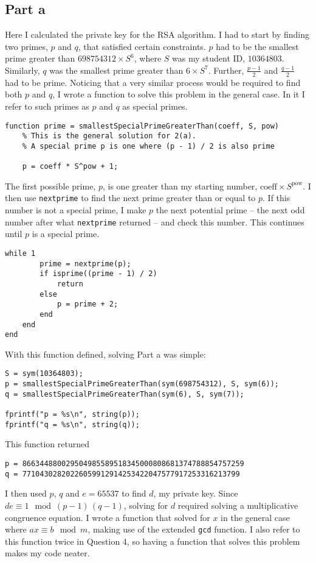 \documentclass[11pt]{article}
\begin{document}
\subsection*{Part a}
Here I calculated the private key for the RSA algorithm. I had to start by finding two primes, $p$ and $q$, that satisfied certain constraints. $p$ had to be the smallest prime greater than $698754312 \times S^6$, where $S$ was my student ID, $10364803$. Similarly, $q$ was the smallest prime greater than $6 \times S^7$. Further, $\frac{p - 1}{2}$ and $\frac{q - 1}{2}$ had to be prime. Noticing that a very similar process would be required to find both $p$ and $q$, I wrote a function to solve this problem in the general case. In it I refer to such primes as $p$ and $q$ as special primes.
\begin{Verbatim}[xleftmargin=0.5in]
function prime = smallestSpecialPrimeGreaterThan(coeff, S, pow)
    % This is the general solution for 2(a). 
    % A special prime p is one where (p - 1) / 2 is also prime

    p = coeff * S^pow + 1;
\end{Verbatim}
The first possible prime, $p$, is one greater than my starting number, $\text{coeff} \times S^\text{pow}$. I then use \texttt{nextprime} to find the next prime greater than or equal to $p$. If this number is not a special prime, I make $p$ the next potential prime -- the next odd number after what \texttt{nextprime} returned -- and check this number. This continues until $p$ is a special prime.
\begin{Verbatim}[xleftmargin=0.5in]
    while 1
        prime = nextprime(p);
        if isprime((prime - 1) / 2)  
            return
        else
            p = prime + 2;
        end 
    end
end
\end{Verbatim}
With this function defined, solving Part a was simple:
\begin{Verbatim}[xleftmargin=0.5in]
S = sym(10364803);
p = smallestSpecialPrimeGreaterThan(sym(698754312), S, sym(6));
q = smallestSpecialPrimeGreaterThan(sym(6), S, sym(7));

fprintf("p = %s\n", string(p));
fprintf("q = %s\n", string(q));
\end{Verbatim}
This function returned
\begin{Verbatim}[xleftmargin=0.5in]
p = 866344880029504985589518345000808681374788854757259
q = 77104302820226059912914253422047577917253316213799
\end{Verbatim}
I then used $p$, $q$ and $e = 65537$ to find $d$, my private key. Since $de \equiv 1 \mod (p - 1) \, (q - 1)$, solving for $d$ required solving a multiplicative congruence equation. I wrote a function that solved for $x$ in the general case where $ax \equiv b \mod m$, making use of the extended \texttt{gcd} function. I also refer to this function twice in Question 4, so having a function that solves this problem makes my code neater.
\end{document}
